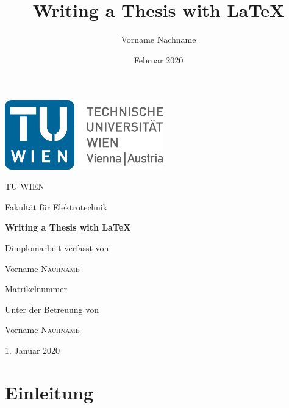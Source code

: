 \documentclass[final,twoside,openright]{book}
\title{Writing a Thesis with \LaTeX}
\author{Vorname Nachname}
\date{Februar 2020}
\newcommand{\thesistitle}{Writing a Thesis with \LaTeX}
\begin{document}
\begin{titlepage}
 \centering
 \includegraphics[height=3cm]{imgs/tu.png}
 \par\vspace{1cm}
 {\scshape\LARGE TU WIEN \par Fakultät für Elektrotechnik \par}
 \vspace{1cm}
 {\huge\bfseries \thesistitle \par}
 \vspace{2cm}
 {Dimplomarbeit verfasst von\par}
 {\Large Vorname \textsc{Nachname}\par}
 {Matrikelnummer \par}
  \vspace{2cm}
 Unter der Betreuung von \par Vorname \textsc{Nachname} \par 
 \vfill
 {\large 1. Januar 2020 \par}
\end{titlepage}



\cleardoublepage


\cleardoublepage


\cleardoublepage



\cleardoublepage
\tableofcontents




\cleardoublepage
\chapter{Einleitung}


\end{document}
